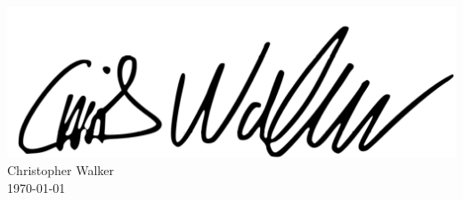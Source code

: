 \begin{titlepage}
    \includegraphics[scale=0.7]{lib/signature.png} \\

    \noindent    Christopher Walker \\ \today
\end{titlepage}

\hypersetup{pageanchor=true} %